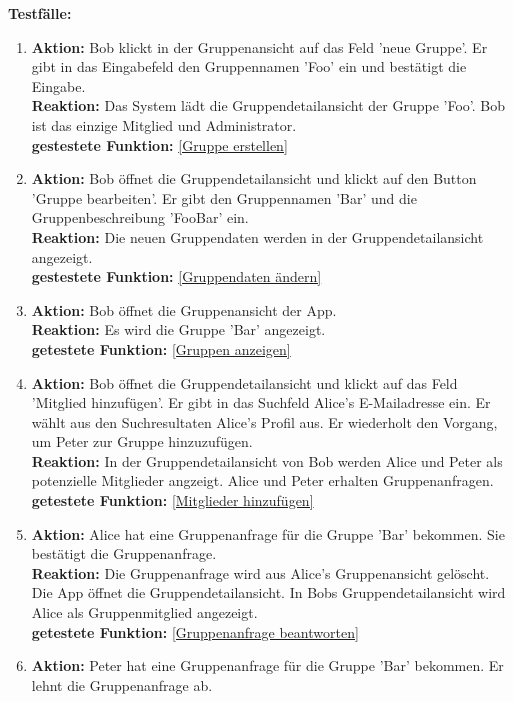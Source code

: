 \documentclass[parskip=full]{scrartcl}
\def\threedigits#1{%
  \ifnum#1<100 0\fi
  \ifnum#1<10 0\fi
  \number#1}
\begin{document}
\textbf{Testfälle:}
\begin{enumerate}[label={\textbf{/T\protect\threedigits{\theenumi}0/}}, leftmargin=*, resume]
	\item \textbf{Aktion:} Bob klickt in der Gruppenansicht auf das Feld 'neue Gruppe'. Er gibt in das Eingabefeld den Gruppennamen 'Foo' ein und bestätigt die Eingabe.\\
	\textbf{Reaktion:} Das System lädt die Gruppendetailansicht der Gruppe 'Foo'. Bob ist das einzige Mitglied und Administrator.\\
	\textbf{gestestete Funktion:} \ref{Gruppe erstellen}
	\item \textbf{Aktion:} Bob öffnet die Gruppendetailansicht und klickt auf den Button 'Gruppe bearbeiten'. Er gibt den Gruppennamen 'Bar' und die Gruppenbeschreibung 'FooBar' ein.\\
	\textbf{Reaktion:} Die neuen Gruppendaten werden in der Gruppendetailansicht angezeigt.\\
	\textbf{gestestete Funktion:} \ref{Gruppendaten ändern}
	\item \textbf{Aktion:} Bob öffnet die Gruppenansicht der App.\\
	\textbf{Reaktion:} Es wird die Gruppe 'Bar' angezeigt.\\
	\textbf{getestete Funktion: }\ref{Gruppen anzeigen}
	\item \textbf{Aktion:} Bob öffnet die Gruppendetailansicht und klickt auf das Feld 'Mitglied hinzufügen'. Er gibt in das Suchfeld Alice's E-Mailadresse ein. Er wählt aus den Suchresultaten Alice's Profil aus. Er wiederholt den Vorgang, um Peter zur Gruppe hinzuzufügen.\\
	\textbf{Reaktion:} In der Gruppendetailansicht von Bob werden Alice und Peter als potenzielle Mitglieder angzeigt. Alice und Peter erhalten Gruppenanfragen.\\
	\textbf{getestete Funktion: }\ref{Mitglieder hinzufügen}
	\item \textbf{Aktion:} Alice hat eine Gruppenanfrage für die Gruppe 'Bar' bekommen. Sie bestätigt die Gruppenanfrage.\\
	\textbf{Reaktion:} Die Gruppenanfrage wird aus Alice's Gruppenansicht gelöscht. Die App öffnet die Gruppendetailansicht. In Bobs Gruppendetailansicht wird Alice als Gruppenmitglied angezeigt.\\
	\textbf{getestete Funktion:} \ref{Gruppenanfrage beantworten}
	\item \textbf{Aktion:} Peter hat eine Gruppenanfrage für die Gruppe 'Bar' bekommen. Er lehnt die Gruppenanfrage ab.\\

\end{enumerate}
\end{document}
